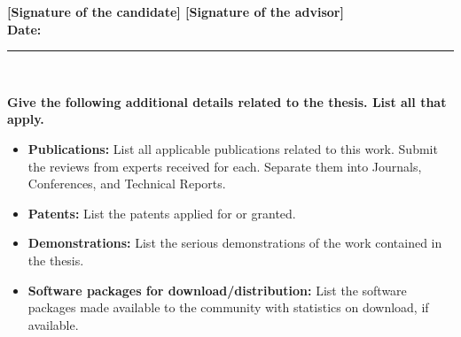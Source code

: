 \documentclass[11pt]{article}
\begin{document}
{\small\bf [Signature of the candidate] \hfill [Signature of the advisor]}
\\[2mm]
{\bf Date:}\\[-2mm]
\hrule

\ \\[-4mm]

{\small
{\normalsize\bf Give the following additional details related to the
  thesis. List all that apply.}
\begin{itemize}\itemsep=0mm
\item {\bf Publications:} List all applicable publications related to this
work.  Submit the reviews from experts received for each. Separate them
into Journals, Conferences, and Technical Reports.
\item {\bf Patents:} List the patents applied for or granted.
\item {\bf Demonstrations:} List the serious demonstrations of the work contained
in the thesis.
\item {\bf Software packages for download/distribution:} List the software packages
made available to the community with statistics on download, if available.
\end{itemize}}
\hspace*{\fill}{\tiny P J Narayanan. Sep 2009}
\end{document}
